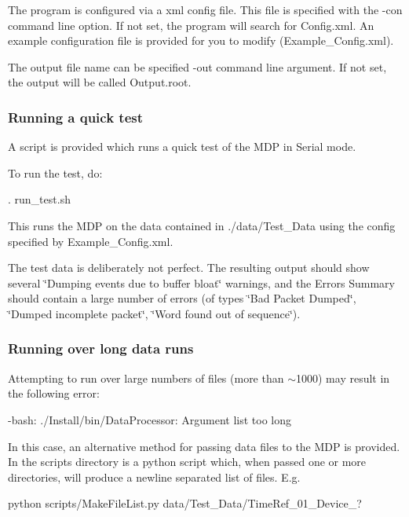 The program is configured via a xml config file. This file is specified with the {\ttfamily -\/con} command line option. If not set, the program will search for {\ttfamily Config.\+xml}. An example configuration file is provided for you to modify ({\ttfamily Example\+\_\+\+Config.\+xml}).

The output file name can be specified {\ttfamily -\/out} command line argument. If not set, the output will be called {\ttfamily Output.\+root}.

\subsubsection*{Running a quick test \label{_RunQuickTest}%
}

A script is provided which runs a quick test of the M\+DP in {\ttfamily Serial} mode.

To run the test, do\+: 
\begin{DoxyCode}
. run\_test.sh
\end{DoxyCode}


This runs the M\+DP on the data contained in {\ttfamily ./data/\+Test\+\_\+\+Data} using the config specified by {\ttfamily Example\+\_\+\+Config.\+xml}.

The test data is deliberately not perfect. The resulting output should show several \char`\"{}\+Dumping events due to buffer bloat\char`\"{} warnings, and the Errors Summary should contain a large number of errors (of types \char`\"{}\+Bad Packet Dumped\char`\"{}, \char`\"{}\+Dumped incomplete packet\char`\"{}, \char`\"{}\+Word found out of sequence\char`\"{}).

\subsubsection*{Running over long data runs \label{_RunLongRuns}%
}

Attempting to run over large numbers of files (more than $\sim$1000) may result in the following error\+: 
\begin{DoxyCode}
-bash: ./Install/bin/DataProcessor: Argument list too long
\end{DoxyCode}


In this case, an alternative method for passing data files to the M\+DP is provided. In the {\ttfamily scripts} directory is a python script which, when passed one or more directories, will produce a newline separated list of files. E.\+g. 
\begin{DoxyCode}
python scripts/MakeFileList.py data/Test\_Data/TimeRef\_01\_Device\_?
\end{DoxyCode}


